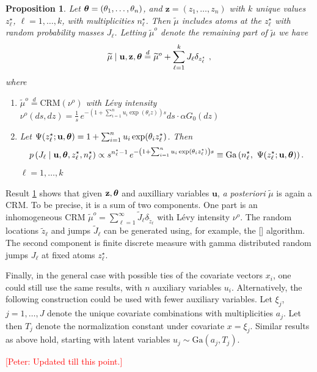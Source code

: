 \documentclass{article}[12pt]
\newcounter{theorem}
\newtheorem{proposition}{Proposition}
\newcommand{\citeab}[1]{\citeauthor{#1} [\href{cite.#1}{\textcolor{blue}{\citeyear{#1}}}]}  %
\newcommand{\refa}[1]{\textcolor{blue}{\ref{#1}}} %
\newcommand{\Ga}{\mbox{Ga}}
\newcommand{\CRM}{\mbox{CRM}}
\renewcommand{\th}{\theta}
\newcommand{\tmu}{\widetilde{\mu}}
\newcommand{\zt}{\widetilde{z}}
\newcommand{\Jt}{\widetilde{J}}
\newcommand{\bth}{\mbox{\boldmath $\theta$}}
\newcommand{\ub}{\mathbf{u}}
\newcommand{\zb}{\mathbf{z}}
\newcommand{\zs}{z^\star}
\newcommand{\ns}{n^\star}
\newcommand{\muc}{\tmu^o}
\newcommand{\nuc}{\nu^o}
\begin{document}
\begin{proposition}
\label{result3}
Let $\bth = (\theta_1, \dots, \theta_n)$, and $\zb = (z_1, \dots,
z_n)$ with $k$ unique values $\zs_\ell$,
$\ell=1,\ldots,k$, with multiplicities $\ns_\ell$. Then $\tmu$ includes atoms at the $\zs_\ell$ with random probability
masses $J_\ell$. Letting $\muc$ denote the remaining part of $\tmu$ we
have  
$$
\tmu \mid \ub, \zb, \bth \stackrel{d}{=}
\muc + \sum_{\ell=1}^k J_\ell \delta_{z^\star_\ell} \ , 
$$
where
\begin{enumerate}
\item[1.]  $\muc \stackrel{d}{=} \CRM\left(\nuc\right)$
   with L\'evy intensity 
   $\nuc(ds, dz) = \frac1s\,
  {e^{-\left(1 + \sum_{i=1}^n u_i \exp(\th_i z) \right) s}} ds
   \cdot \alpha G_0(dz)$ 
 \item[2.] Let
   $\Psi(z^\star_\ell; \ub, \bth) = 1 + \sum_{i=1}^n u_i
   \exp(\th_i z^\star_\ell)$. Then
   $$
   p\left(J_\ell \mid \ub,  \bth, z^\star_\ell, \ns_\ell\right) 
   \propto s^{\ns_\ell - 1}\,
   e^{- \left(1 +
       \sum_{i=1}^n u_i \exp(\th_i z^\star_\ell)\right) s}
   \equiv \Ga\left(\ns_\ell, \ \Psi(z^\star_\ell; \ub, \bth)\right).
   $$
   $\ell = 1, \dots, k$  
\end{enumerate}  
\end{proposition}
Result \refa{result3} shows that given $\zb, \bth$ and auxilliary
variables $\ub$, {\em a posteriori} $\tmu$ is again a CRM. To be
precise, it is a sum of two components. One part is an inhomogeneous CRM
$\muc = \sum_{\ell = 1}^\infty \Jt_\ell \delta_{\zt_\ell}$ with L\'evy
intensity $\nuc$.
The random locations $\zt_\ell$ and jumps $\Jt_\ell$ can be generated
using, for example,
the \citeab{ferguson1972representation} algorithm.
The second component is finite discrete measure with gamma distributed
random jumps $J_\ell$ at fixed atoms $\zs_\ell$.

Finally, in the general case with possible ties of the covariate
vectors $x_i$, one could still use the same results, with $n$
auxiliary variables $u_i$. Alternatively, the following construction
could be used with fewer auxiliary variables.
Let $\xi_j$, $j=1,\ldots,J$ denote the unique covariate
combinations with multiplicities $a_j$.
Let then $T_j$ denote the normalization constant under covariate $x=\xi_j$.
Similar results as above hold, starting with latent variables $u_j
\sim \Ga(a_j, T_j)$. 

\textcolor{red}{[Peter: Updated till this point.]}
\end{document}
